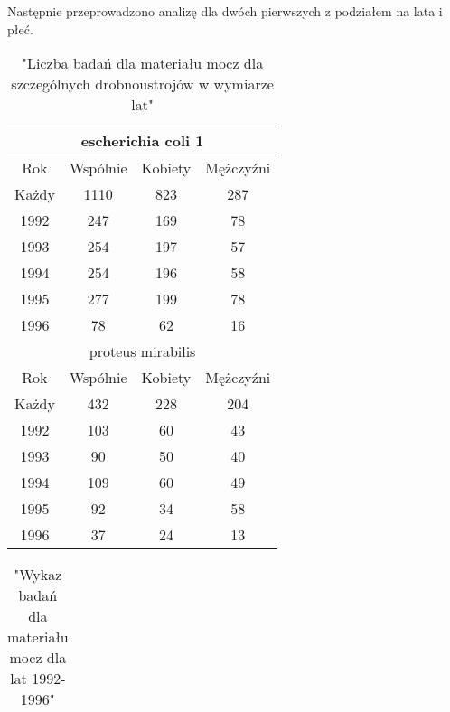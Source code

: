 \documentclass[a4paper,11pt]{article}
\begin{document}
Następnie przeprowadzono analizę dla dwóch pierwszych z podziałem na lata i płeć.

\begin{table}[h]
  \begin{center}
  \caption{"Liczba badań dla materiału mocz dla szczególnych drobnoustrojów w wymiarze lat"}
  \begin{tabular}{|c|c|c|c|}
    \hline
    \multicolumn{4}{|c|}{escherichia coli 1} \\ 
    \hline Rok &Wspólnie & Kobiety & Mężczyźni \\ \hline
    Każdy& 1110& 823& 287 \\ \hline 
    1992& 247& 169& 78 \\ \hline
    1993& 254& 197& 57 \\ \hline
    1994& 254& 196& 58 \\ \hline
    1995& 277& 199& 78 \\ \hline
    1996& 78& 62& 16 \\ \hline

    \multicolumn{4}{|c|}{proteus mirabilis} \\ \hline
    Rok &Wspólnie & Kobiety & Mężczyźni \\ \hline
    Każdy& 432& 228& 204 \\ \hline 
    1992& 103& 60& 43 \\ \hline
    1993& 90& 50& 40 \\ \hline
    1994& 109& 60& 49 \\ \hline
    1995& 92& 34& 58 \\ \hline
    1996& 37& 24& 13 \\ \hline
  \end{tabular}
\end{center}
\end{table}


\begin{table}[h]
  \begin{center}
  \caption{"Wykaz badań dla materiału mocz dla lat 1992-1996"}
  \begin{tabular}{|c|c|c|c|}

  \end{tabular}
\end{center}
\end{table}
\end{document}

